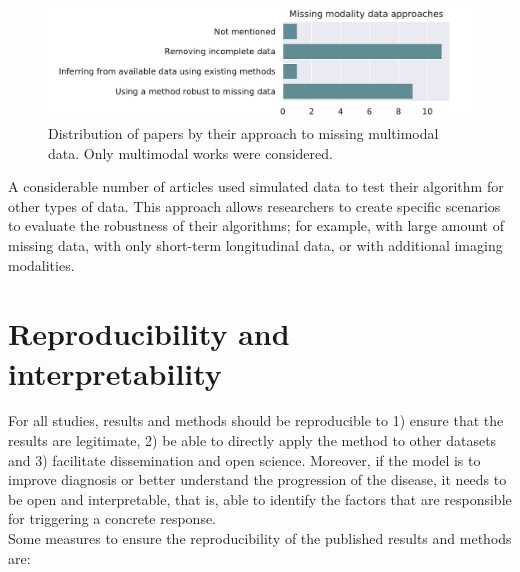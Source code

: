 \begin{figure}[!htbp]
     \centering
     \includegraphics[width=1.0\textwidth]{figures/review/Fig9.pdf}
     \caption[Distribution of papers by their approach to missing multimodal data.]{Distribution of papers by their approach to missing multimodal data. Only multimodal works were considered.}
     \label{fig:missingmod}
\end{figure}

A considerable number of articles \cite{Chen2011b,Chen2012,Eshaghi2017,Hyun2016,Li2013,Li2017b,Zhang2014,Ziegler2015b} used simulated data to test their algorithm for other types of data. This approach allows researchers to create specific scenarios to evaluate the robustness of their algorithms; for example, with large amount of missing data, with only short-term longitudinal data, or with additional imaging modalities. \\

\section{Reproducibility and interpretability}
\label{sec:bias}

For all studies, results and methods should be reproducible to 1) ensure that the results are legitimate, 2) be able to directly apply the method to other datasets and 3) facilitate dissemination and open science. Moreover, if the model is to improve diagnosis or better understand the progression of the disease, it needs to be open and interpretable, that is, able to identify the factors that are responsible for triggering a concrete response. \\

Some measures to  ensure the reproducibility of the published results and methods are:

